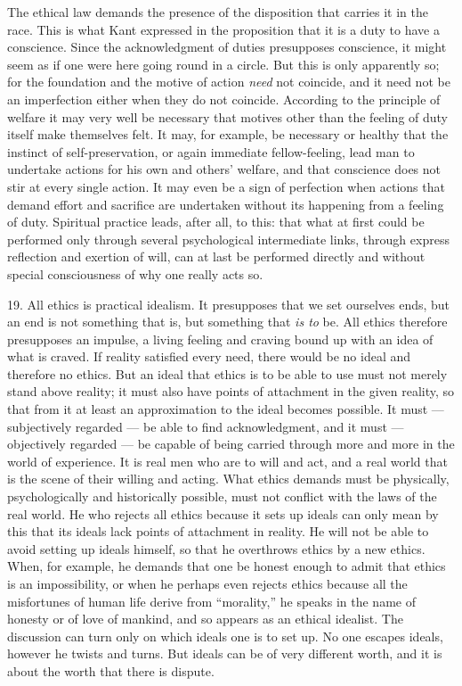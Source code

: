 \documentclass[12pt,a4paper,openany]{book}
\newcommand{\opage}[1]{\marginnote{\footnotesize\textit{[#1]}}}
\begin{document}
The ethical law demands the presence of the disposition
\opage{62}that carries it in the race. This is what Kant expressed in the proposition that it is a duty to
have a conscience. Since the acknowledgment of duties presupposes conscience, it might seem as if one
were here going round in a circle. But this is only apparently so; for the foundation and the motive of
action \textit{need} not coincide, and it need not be an imperfection either when they do not coincide.
According to the principle of welfare it may very well be necessary that motives other than the
feeling of duty itself make themselves felt. It may, for example, be necessary or healthy that the
instinct of self-preservation, or again immediate fellow-feeling, lead man to undertake actions for
his own and others' welfare, and that conscience does not stir at every single action. It may even be
a sign of perfection when actions that demand effort and sacrifice are undertaken without its
happening from a feeling of duty. Spiritual practice leads, after all, to this: that what at first
could be performed only through several psychological intermediate links, through express reflection
and exertion of will, can at last be performed directly and without special consciousness of why one
really acts so.

19. All ethics is practical idealism. It presupposes that we set ourselves ends, but an end is not
something that is, but something that \textit{is to} be. All ethics therefore presupposes an impulse, a
living feeling and craving bound up with an idea of what is craved. If reality satisfied every need,
there would be no ideal and therefore no ethics. But an ideal that ethics is to be able to use must not
merely stand above reality; it must also have points of attachment in the given reality, so that from
it at least an approximation to the ideal becomes possible. It must --- subjectively regarded --- be
able to find acknowledgment, and it must --- objectively regarded --- be capable of being carried
through more and more in the world of experience. It is real men who are to will and act, and a real
world that is the scene of their willing and acting. What ethics demands must be physically,
psychologically and historically possible, must not conflict with the laws of the real world. He who
rejects all ethics because it sets up ideals
\opage{63}can only mean by this that its ideals lack points of attachment in reality. He will not be able to
avoid setting up ideals himself, so that he overthrows ethics by a new ethics. When, for example, he
demands that one be honest enough to admit that ethics is an impossibility, or when he perhaps even
rejects ethics because all the misfortunes of human life derive from ``morality,'' he speaks in the
name of honesty or of love of mankind, and so appears as an ethical idealist. The discussion can turn
only on which ideals one is to set up. No one escapes ideals, however he twists and turns. But ideals
can be of very different worth, and it is about the worth that there is dispute.
\end{document}
